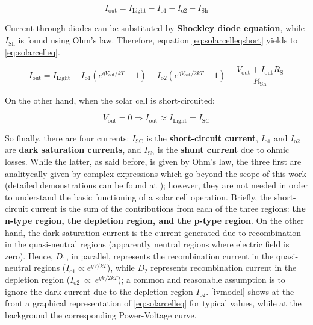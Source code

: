 			\begin{equation} \label{eq:solarcelleqshort}
				I_{\text{out}}=I_{\text{Light}}-I_{\text{o1}}-I_{\text{o2}}-I_{\text{Sh}}
			\end{equation}
			
			Current through diodes can be substituted by \textbf{Shockley diode equation}, while $I_{\text{Sh}}$ is found using Ohm's law. Therefore, equation \autoref{eq:solarcelleqshort} yields to \autoref{eq:solarcelleq}.
			
			\begin{equation} \label{eq:solarcelleq}
		I_{\text{out}}=I_{\text{Light}}-I_{\text{o1}}(e^{qV_{\text{out}}/kT}-1)-I_{\text{o2}}(e^{qV_{\text{out}}/2kT}-1)-\frac{V_{\text{out}}+I_{\text{out}}R_{\text{S}}}{{R_{\text{Sh}}}}
		\end{equation}
			
			On the other hand, when the solar cell is short-circuited:
			
				\begin{equation} \label{ilightisc}
					V_{\text{out}}=0 \Rightarrow I_{\text{out}} \approx I_{\text{Light}}=I_{\text{SC}}
				\end{equation}
			
						
			So finally, there are four currents: $I_{\text{SC}}$ is the \textbf{short-circuit current}, $I_{\text{o1}}$ and  $I_{\text{o2}}$ are \textbf{dark saturation currents}, and $I_{\text{Sh}}$  is the \textbf{shunt current} due to ohmic losses. While the latter, as said before, is given by Ohm's law, the three first are analitycally given by complex expressions which go beyond the scope of this work (detailed demonstrations can be found at \cite{photovoltaichandbook}); however, they are not needed in order to understand the basic functioning of a solar cell operation. Briefly, the short-circuit current is the sum of the contributions from each of the three regions: \textbf{the n-type region, the depletion region, and the p-type region}. On the other hand, the dark saturation current is the current generated due to recombination in the quasi-neutral regions (apparently neutral regions where electric field is zero). Hence, $D_1$, in parallel, represents the recombination current in the quasi-neutral regions ($ I_{\text{o1}} \propto e^{qV/kT} $), while $D_2$ represents recombination current in the depletion region ($ I_{\text{o2}}~\propto~e^{qV/2kT} $); a common and reasonable assumption is to ignore the dark current due to the depletion region $ I_{\text{o2}} $. \autoref{ivmodel} shows at the front a graphical representation of \autoref{eq:solarcelleq} for typical values, while at the background the corresponding Power-Voltage curve.


